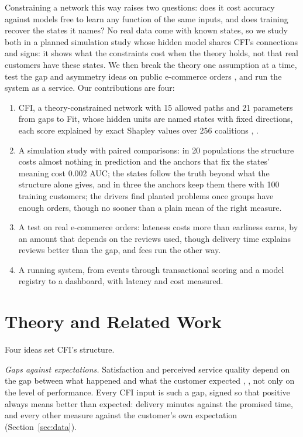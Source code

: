 \documentclass[10pt,twocolumn,letterpaper]{article}
\newcommand{\secref}[1]{Section~\mbox{\ref{#1}}}
\newcommand{\runin}[1]{\textit{#1}\hspace{0.4em}}
\begin{document}
Constraining a network this way raises two questions: does it cost accuracy against models free to learn any function of the same inputs, and does training recover the states it names? No real data come with known states, so we study both in a planned simulation study \cite{morris2019} whose hidden model shares CFI's connections and signs: it shows what the constraints cost when the theory holds, not that real customers have these states. We then break the theory one assumption at a time, test the gap and asymmetry ideas on public e-commerce orders \cite{olist2018}, and run the system as a service. Our contributions are four:
\begin{enumerate}
\item CFI, a theory-constrained network with 15 allowed paths and 21 parameters from gaps to Fit, whose hidden units are named states with fixed directions, each score explained by exact Shapley values over 256 coalitions \cite{lundberg2017}, \cite{sundararajan2020}.
\item A simulation study with paired comparisons: in 20 populations the structure costs almost nothing in prediction and the anchors that fix the states' meaning cost 0.002 AUC; the states follow the truth beyond what the structure alone gives, and in three the anchors keep them there with 100 training customers; the drivers find planted problems once groups have enough orders, though no sooner than a plain mean of the right measure.
\item A test on real e-commerce orders: lateness costs more than earliness earns, by an amount that depends on the reviews used, though delivery time explains reviews better than the gap, and fees run the other way.
\item A running system, from events through transactional scoring and a model registry to a dashboard, with latency and cost measured.
\end{enumerate}

\section{Theory and Related Work}\label{sec:theory}

Four ideas set CFI's structure.

\runin{Gaps against expectations.} Satisfaction and perceived service quality depend on the gap between what happened and what the customer expected \cite{oliver1980}, \cite{parasuraman1985}, not only on the level of performance. Every CFI input is such a gap, signed so that positive always means better than expected: delivery minutes against the promised time, and every other measure against the customer's own expectation (\secref{sec:data}).
\end{document}

